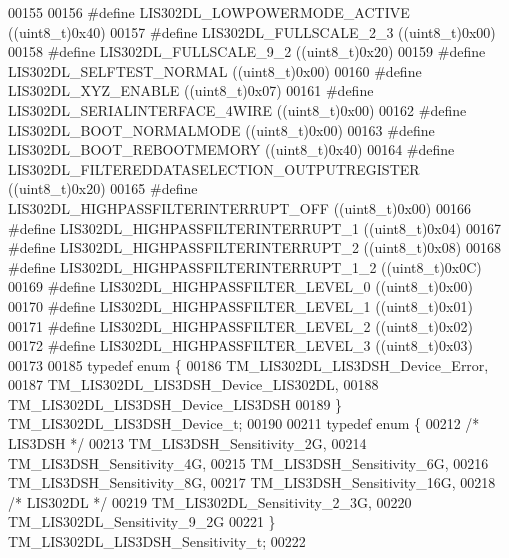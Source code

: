 \begin{DoxyCode}
00155 
00156 \textcolor{preprocessor}{#define LIS302DL\_LOWPOWERMODE\_ACTIVE                    ((uint8\_t)0x40)}
00157 \textcolor{preprocessor}{#define LIS302DL\_FULLSCALE\_2\_3                          ((uint8\_t)0x00)}
00158 \textcolor{preprocessor}{#define LIS302DL\_FULLSCALE\_9\_2                          ((uint8\_t)0x20)}
00159 \textcolor{preprocessor}{#define LIS302DL\_SELFTEST\_NORMAL                        ((uint8\_t)0x00)}
00160 \textcolor{preprocessor}{#define LIS302DL\_XYZ\_ENABLE                             ((uint8\_t)0x07)}
00161 \textcolor{preprocessor}{#define LIS302DL\_SERIALINTERFACE\_4WIRE                  ((uint8\_t)0x00)}
00162 \textcolor{preprocessor}{#define LIS302DL\_BOOT\_NORMALMODE                        ((uint8\_t)0x00)}
00163 \textcolor{preprocessor}{#define LIS302DL\_BOOT\_REBOOTMEMORY                      ((uint8\_t)0x40)}
00164 \textcolor{preprocessor}{#define LIS302DL\_FILTEREDDATASELECTION\_OUTPUTREGISTER   ((uint8\_t)0x20)}
00165 \textcolor{preprocessor}{#define LIS302DL\_HIGHPASSFILTERINTERRUPT\_OFF            ((uint8\_t)0x00)}
00166 \textcolor{preprocessor}{#define LIS302DL\_HIGHPASSFILTERINTERRUPT\_1              ((uint8\_t)0x04)}
00167 \textcolor{preprocessor}{#define LIS302DL\_HIGHPASSFILTERINTERRUPT\_2              ((uint8\_t)0x08)}
00168 \textcolor{preprocessor}{#define LIS302DL\_HIGHPASSFILTERINTERRUPT\_1\_2            ((uint8\_t)0x0C)}
00169 \textcolor{preprocessor}{#define LIS302DL\_HIGHPASSFILTER\_LEVEL\_0                 ((uint8\_t)0x00)}
00170 \textcolor{preprocessor}{#define LIS302DL\_HIGHPASSFILTER\_LEVEL\_1                 ((uint8\_t)0x01)}
00171 \textcolor{preprocessor}{#define LIS302DL\_HIGHPASSFILTER\_LEVEL\_2                 ((uint8\_t)0x02)}
00172 \textcolor{preprocessor}{#define LIS302DL\_HIGHPASSFILTER\_LEVEL\_3                 ((uint8\_t)0x03)}
00173 
00185 \textcolor{keyword}{typedef} \textcolor{keyword}{enum} \{
00186     TM\_LIS302DL\_LIS3DSH\_Device\_Error,
00187     TM\_LIS302DL\_LIS3DSH\_Device\_LIS302DL,
00188     TM\_LIS302DL\_LIS3DSH\_Device\_LIS3DSH
00189 \} TM\_LIS302DL\_LIS3DSH\_Device\_t;
00190 
00211 \textcolor{keyword}{typedef} \textcolor{keyword}{enum} \{
00212     \textcolor{comment}{/* LIS3DSH */}
00213     TM\_LIS3DSH\_Sensitivity\_2G,
00214     TM\_LIS3DSH\_Sensitivity\_4G,
00215     TM\_LIS3DSH\_Sensitivity\_6G,
00216     TM\_LIS3DSH\_Sensitivity\_8G,
00217     TM\_LIS3DSH\_Sensitivity\_16G,
00218     \textcolor{comment}{/* LIS302DL */}
00219     TM\_LIS302DL\_Sensitivity\_2\_3G,
00220     TM\_LIS302DL\_Sensitivity\_9\_2G
00221 \} TM\_LIS302DL\_LIS3DSH\_Sensitivity\_t;
00222 

\end{DoxyCode}
